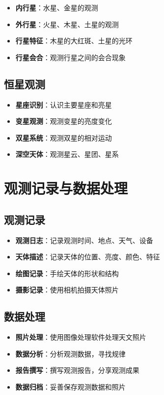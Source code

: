 \documentclass[12pt,UTF8]{ctexbook}
\begin{document}
\begin{itemize}
  \item \textbf{内行星}：水星、金星的观测
  \item \textbf{外行星}：火星、木星、土星的观测
  \item \textbf{行星特征}：木星的大红斑、土星的光环
  \item \textbf{行星会合}：观测行星之间的会合现象
\end{itemize}

\subsection{恒星观测}

\begin{itemize}
  \item \textbf{星座识别}：认识主要星座和亮星
  \item \textbf{变星观测}：观测变星的亮度变化
  \item \textbf{双星系统}：观测双星的相对运动
  \item \textbf{深空天体}：观测星云、星团、星系
\end{itemize}

\section{观测记录与数据处理}

\subsection{观测记录}

\begin{itemize}
  \item \textbf{观测日志}：记录观测时间、地点、天气、设备
  \item \textbf{天体描述}：记录天体的位置、亮度、颜色、特征
  \item \textbf{绘图记录}：手绘天体的形状和结构
  \item \textbf{摄影记录}：使用相机拍摄天体照片
\end{itemize}

\subsection{数据处理}

\begin{itemize}
  \item \textbf{照片处理}：使用图像处理软件处理天文照片
  \item \textbf{数据分析}：分析观测数据，寻找规律
  \item \textbf{报告撰写}：撰写观测报告，分享观测成果
  \item \textbf{数据归档}：妥善保存观测数据和照片
\end{itemize}
\end{document}
